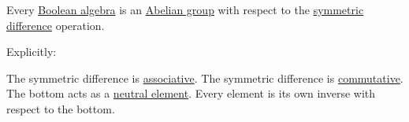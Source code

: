\begin{proposition}\label{thm:symmetric_difference_abelian_group}
  Every \hyperref[def:boolean_algebra]{Boolean algebra} is an \hyperref[def:abelian_group]{Abelian group} with respect to the \hyperref[def:symmetric_difference]{symmetric difference} operation.

  Explicitly:
  \begin{thmenum}
     The symmetric difference is \hyperref[def:binary_operation/associative]{associative}.
     The symmetric difference is \hyperref[def:binary_operation/commutative]{commutative}.
     The bottom acts as a \hyperref[def:semigroup_neutral_element]{neutral element}.
     Every element is its own inverse with respect to the bottom.
  \end{thmenum}
\end{proposition}
